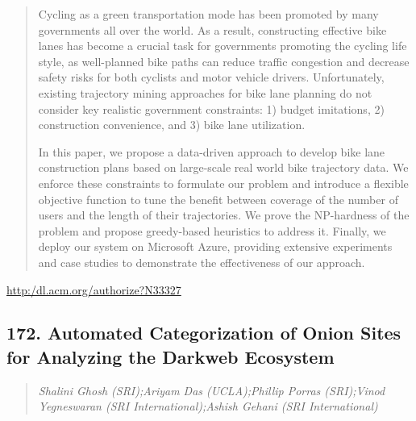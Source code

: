 \documentclass{article}
\begin{document}
\begin{quote}
Cycling as a green transportation mode has been promoted by many governments all over the world. As a result, constructing effective bike lanes has become a crucial task for governments promoting the cycling life style, as well-planned bike paths can reduce traffic congestion and decrease safety risks for both cyclists and motor vehicle drivers. Unfortunately, existing trajectory mining approaches for bike lane planning do not consider key realistic government constraints: 1) budget imitations, 2) construction convenience, and 3) bike lane utilization. 







  In this paper, we propose a data-driven approach to develop bike lane construction plans based on large-scale real world bike trajectory data. We enforce these constraints to formulate our problem and introduce a flexible objective function to tune the benefit between coverage of the number of users and the length of their trajectories. We prove the NP-hardness of the problem and propose greedy-based heuristics to address it. Finally, we deploy our system on Microsoft Azure, providing extensive experiments and case studies to demonstrate the effectiveness of our approach.
\end{quote}

\href{http:/dl.acm.org/authorize?N33327}{http:/dl.acm.org/authorize?N33327}

\subsection{172. Automated Categorization of Onion Sites for Analyzing the Darkweb Ecosystem}

\begin{quote}
\footnotesize{\textit{Shalini Ghosh (SRI);Ariyam Das (UCLA);Phillip Porras (SRI);Vinod Yegneswaran (SRI International);Ashish Gehani (SRI International)}}

\end{quote}
\end{document}
